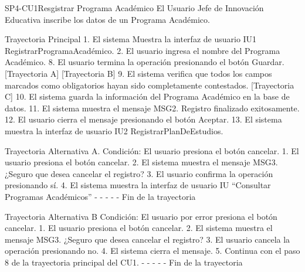  \begin{UseCase}[marker]{SP4-CU1}{Resgistrar Programa Académico}
	{
		El Usuario Jefe de Innovación Educativa inscribe los datos de un Programa Académico.
	}
 \end{UseCase}

Trayectoria Principal
1.	El sistema Muestra la interfaz de usuario IU1 RegistrarProgramaAcadémico.
2.	El usuario ingresa el nombre del Programa Académico.
8.	El usuario termina la operación presionando el botón Guardar. [Trayectoria A] [Trayectoria B]
9.	El sistema verifica que todos los campos marcados como obligatorios hayan sido completamente contestados. [Trayectoria C]
10.	El sistema guarda la información del Programa Académico en la base de datos.
11.	El sistema muestra el mensaje MSG2. Registro finalizado exitosamente.
12.	El usuario cierra el mensaje presionando el botón Aceptar.
13.	El sistema muestra la interfaz de usuario IU2 RegistrarPlanDeEstudios.

Trayectoria Alternativa A.
Condición: El usuario presiona el botón cancelar.
1.	El usuario presiona el botón cancelar.
2.	El sistema muestra el mensaje MSG3. ¿Seguro que desea cancelar el registro? 
3.	El usuario confirma la operación presionando sí.
4.	El sistema muestra la interfaz de usuario IU “Consultar Programas Académicos”
-	- - - - Fin de la trayectoria

Trayectoria Alternativa B
Condición: El usuario por error presiona el botón cancelar.
1.	El usuario presiona el botón cancelar.
2.	El sistema muestra el mensaje MSG3. ¿Seguro que desea cancelar el registro? 
3.	El usuario cancela la operación presionando no.
4.	El sistema cierra el mensaje.
5.	Continua con el paso 8 de la trayectoria principal del CU1.
-	- - - - Fin de la trayectoria

